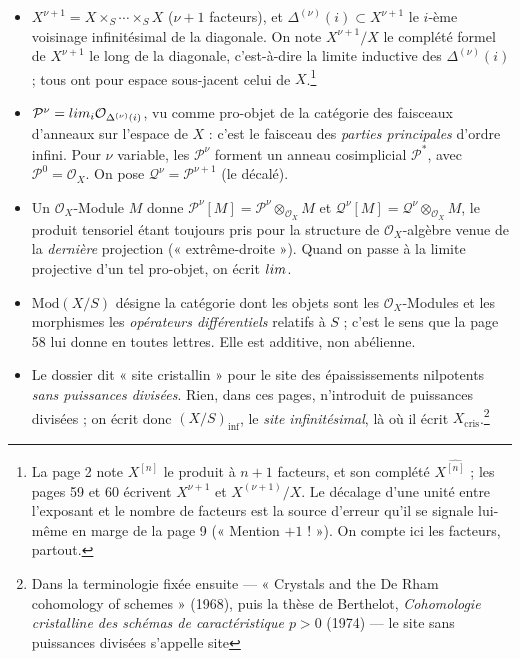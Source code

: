 \documentclass[11pt,a4paper]{article}
\begin{document}
\begin{itemize}
\item $X^{\nu+1} = X \times_{S} \cdots \times_{S} X$ ($\nu+1$ facteurs), et
  $\Delta^{(\nu)}(i) \subset X^{\nu+1}$ le $i$-ème voisinage infinitésimal de
  la diagonale. On note $X^{\nu+1}/X$ le complété formel de $X^{\nu+1}$ le
  long de la diagonale, c'est-à-dire la limite inductive des
  $\Delta^{(\nu)}(i)$ ; tous ont pour espace sous-jacent celui de
  $X$.\footnote{La page 2 note $X^{[n]}$ le produit à $n+1$ facteurs, et son
  complété $X^{\widehat{[n]}}$ ; les pages 59 et 60 écrivent $X^{\nu+1}$ et
  $X^{(\nu+1)}/X$. Le décalage d'une unité entre l'exposant et le nombre de
  facteurs est la source d'erreur qu'il se signale lui-même en marge de la
  page 9 (« Mention $+1$ ! »). On compte ici les facteurs, partout.}
\item $\mathcal{P}^{\nu} = \varprojlim_{i} \mathcal{O}_{\Delta^{(\nu)}(i)}$,
  vu comme pro-objet de la catégorie des faisceaux d'anneaux sur l'espace de
  $X$ : c'est le faisceau des \emph{parties principales} d'ordre infini.
  Pour $\nu$ variable, les $\mathcal{P}^{\nu}$ forment un anneau cosimplicial
  $\mathcal{P}^{*}$, avec $\mathcal{P}^{0} = \mathcal{O}_X$. On pose
  $\mathcal{Q}^{\nu} = \mathcal{P}^{\nu+1}$ (le décalé).
\item Un $\mathcal{O}_X$-Module $M$ donne $\mathcal{P}^{\nu}[M] =
  \mathcal{P}^{\nu} \otimes_{\mathcal{O}_X} M$ et $\mathcal{Q}^{\nu}[M] =
  \mathcal{Q}^{\nu} \otimes_{\mathcal{O}_X} M$, le produit tensoriel étant
  toujours pris pour la structure de $\mathcal{O}_X$-algèbre venue de la
  \emph{dernière} projection (« extrême-droite »). Quand on passe à la limite
  projective d'un tel pro-objet, on écrit $\varprojlim$.
\item $\mathrm{Mod}(X/S)$ désigne la catégorie dont les objets sont les
  $\mathcal{O}_X$-Modules et les morphismes les \emph{opérateurs
  différentiels} relatifs à $S$ ; c'est le sens que la page 58 lui donne en
  toutes lettres. Elle est additive, non abélienne.
\item Le dossier dit « site cristallin » pour le site des épaississements
  nilpotents \emph{sans puissances divisées}. Rien, dans ces pages,
  n'introduit de puissances divisées ; on écrit donc $(X/S)_{\mathrm{inf}}$,
  le \emph{site infinitésimal}, là où il écrit
  $X_{\mathrm{cris}}$.\footnote{Dans la terminologie fixée ensuite —
  « Crystals and the De Rham cohomology of schemes » (1968), puis la thèse de
  Berthelot, \emph{Cohomologie cristalline des schémas de caractéristique
  $p > 0$} (1974) — le site sans puissances divisées s'appelle site
}
\end{itemize}
\end{document}
